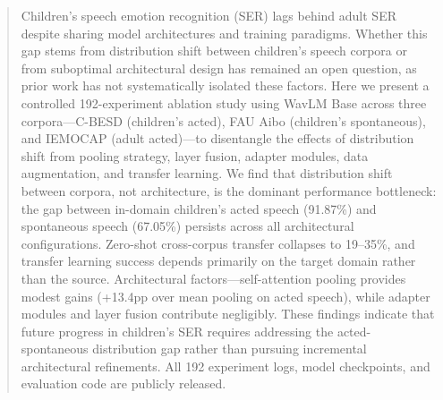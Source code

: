 \begin{abstract}
Children's speech emotion recognition (SER) lags behind adult SER despite sharing model architectures and training paradigms. Whether this gap stems from distribution shift between children's speech corpora or from suboptimal architectural design has remained an open question, as prior work has not systematically isolated these factors. Here we present a controlled 192-experiment ablation study using WavLM Base across three corpora---C-BESD (children's acted), FAU Aibo (children's spontaneous), and IEMOCAP (adult acted)---to disentangle the effects of distribution shift from pooling strategy, layer fusion, adapter modules, data augmentation, and transfer learning. We find that distribution shift between corpora, not architecture, is the dominant performance bottleneck: the gap between in-domain children's acted speech (91.87\%) and spontaneous speech (67.05\%) persists across all architectural configurations. Zero-shot cross-corpus transfer collapses to 19--35\%, and transfer learning success depends primarily on the target domain rather than the source. Architectural factors---self-attention pooling provides modest gains (+13.4pp over mean pooling on acted speech), while adapter modules and layer fusion contribute negligibly. These findings indicate that future progress in children's SER requires addressing the acted-spontaneous distribution gap rather than pursuing incremental architectural refinements. All 192 experiment logs, model checkpoints, and evaluation code are publicly released.
\end{abstract}
